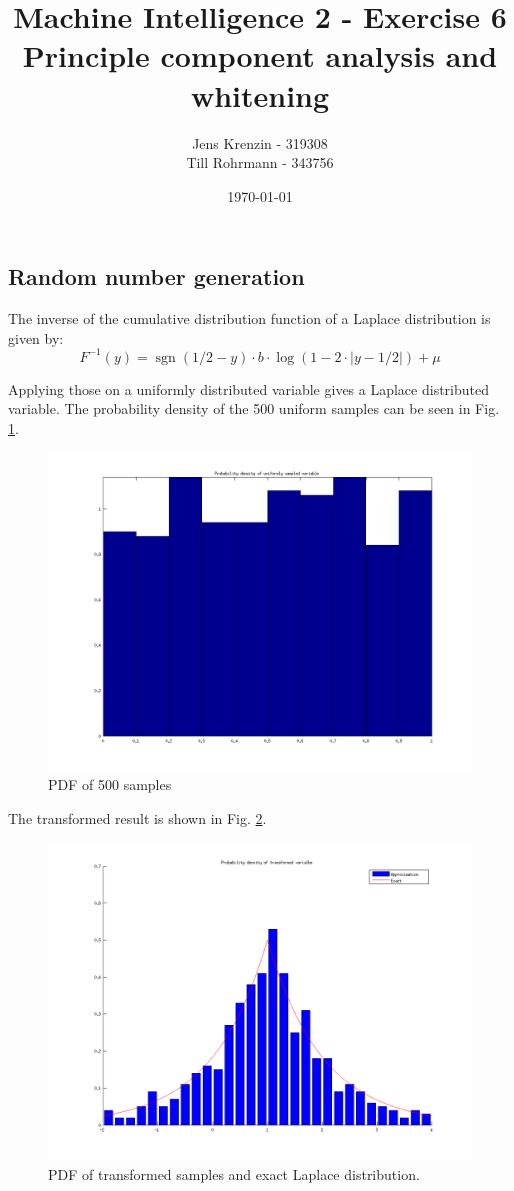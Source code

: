 \documentclass{article}
\title{Machine Intelligence 2 - Exercise 6\\
Principle component analysis and whitening}
\author{Jens Krenzin - 319308\\
Till Rohrmann - 343756}
\date{\today}
\newcommand{\sgn}{\operatorname{sgn}}
\newcommand{\abs}[1]{\lvert#1\rvert}
\begin{document}
	\maketitle
	\setcounter{section}{5}
	\setcounter{subsection}{1}
	\subsection{Random number generation}
		The inverse of the cumulative distribution function of a Laplace distribution is given by:
		\begin{displaymath}
			F^{-1}(y) = \sgn(1/2-y) \cdot b \cdot \log(1-2\cdot\abs{y-1/2}) +\mu
		\end{displaymath}
		
		Applying those on a uniformly distributed variable gives a Laplace distributed variable. The probability density of the 500 uniform samples can be seen in Fig. \ref{fig:uniform}.
		\begin{figure}[H]
			\centering
			\includegraphics[width=12cm]{uniform.png}
			\caption{PDF of 500 samples}
			\label{fig:uniform}
		\end{figure}
		
		The transformed result is shown in Fig. \ref{fig:transformation}.
		\begin{figure}[H]
			\centering
			\includegraphics[width=12cm]{transformation.png}
			\caption{PDF of transformed samples and exact Laplace distribution.}
			\label{fig:transformation}
		\end{figure}
\end{document}
